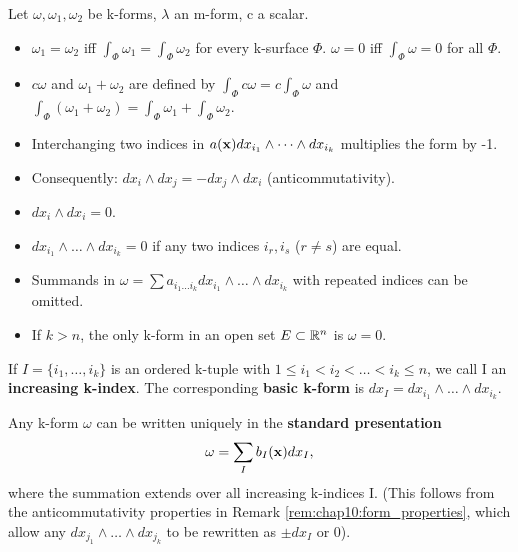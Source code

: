 \begin{remark}
  \label{rem:chap10:form_properties}
  Let $\omega, \omega_1, \omega_2$ be k-forms, $\lambda$ an m-form, c a scalar.
  \begin{itemize}
    \item $\omega_1 = \omega_2$ iff $\int_\Phi \omega_1 = \int_\Phi
      \omega_2$ for every k-surface $\Phi$. $\omega=0$ iff $\int_\Phi
      \omega = 0$ for all $\Phi$.
    \item $c\omega$ and $\omega_1 + \omega_2$ are defined by
      $\int_\Phi c\omega = c \int_\Phi \omega$ and $\int_\Phi
      (\omega_1 + \omega_2) = \int_\Phi \omega_1 + \int_\Phi \omega_2$.
    \item Interchanging two indices in $a(\mathbf{x}) dx_{i_1} \wedge
      \dots \wedge dx_{i_k}$ multiplies the form by -1.
    \item Consequently: $dx_i \wedge dx_j = - dx_j \wedge dx_i$
      (anticommutativity).
    \item $dx_i \wedge dx_i = 0$.
    \item $dx_{i_1} \wedge \dots \wedge dx_{i_k} = 0$ if any two
      indices $i_r, i_s$ ($r \ne s$) are equal.
    \item Summands in $\omega = \sum a_{i_1 \dots i_k} dx_{i_1}
      \wedge \dots \wedge dx_{i_k}$ with repeated indices can be omitted.
    \item If $k > n$, the only k-form in an open set $E \subset \mathbb{R}^n$
      is $\omega=0$.
  \end{itemize}
\end{remark}

\begin{definition}
  \label{def:chap10:basic_forms_standard_presentation}
  If $I = \{ i_1, \dots, i_k \}$ is an ordered k-tuple with $1 \le
  i_1 < i_2 < \dots < i_k \le n$, we call I an \textbf{increasing
  k-index}. The corresponding \textbf{basic k-form} is $dx_I =
  dx_{i_1} \wedge \dots \wedge dx_{i_k}$.

  Any k-form $\omega$ can be written uniquely in the \textbf{standard
  presentation}
  \[
    \omega = \sum_I b_I(\mathbf{x}) dx_I,
  \]
  where the summation extends over all increasing k-indices I. (This
    follows from the anticommutativity properties in Remark
    \ref{rem:chap10:form_properties}, which allow any $dx_{j_1} \wedge
  \dots \wedge dx_{j_k}$ to be rewritten as $\pm dx_I$ or 0).
\end{definition}

